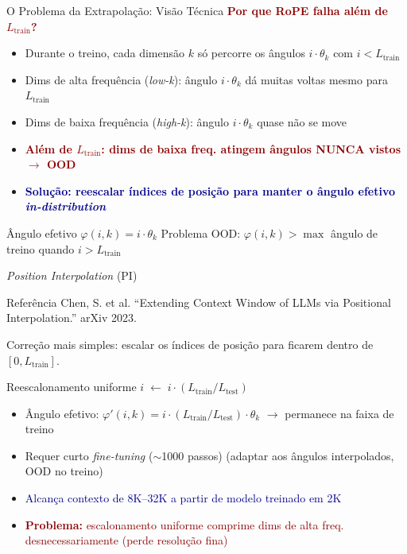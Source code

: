 \documentclass[aspectratio=169, xcolor=dvipsnames]{beamer}
\begin{document}
  \begin{frame}{O Problema da Extrapolação: Visão Técnica}
    \textcolor{DarkRed}{\textbf{Por que RoPE falha além de $L_{\text{train}}$?}}

    \begin{itemize}
      \item Durante o treino, cada dimensão $k$ só percorre os ângulos $i \cdot \theta_k$ com $i < L_{\text{train}}$
      \item Dims de alta frequência (\textit{low-k}): ângulo $i \cdot \theta_k$ dá muitas voltas mesmo para $L_{\text{train}}$
      \item Dims de baixa frequência (\textit{high-k}): ângulo $i \cdot \theta_k$ quase não se move
      \item \textcolor{DarkRed}{\textbf{Além de $L_{\text{train}}$: dims de baixa freq. atingem ângulos NUNCA vistos $\to$ OOD}}
      \item \textcolor{DarkBlue}{\textbf{Solução: reescalar índices de posição para manter o ângulo efetivo \textit{in-distribution}}}
    \end{itemize}

    \begin{exampleblock}{Ângulo efetivo}
      $\varphi(i, k) = i \cdot \theta_k$ \qquad Problema OOD: $\varphi(i, k) > \max$ ângulo de treino quando $i > L_{\text{train}}$
    \end{exampleblock}
  \end{frame}

  \begin{frame}{\textit{Position Interpolation} (PI)}
    \begin{exampleblock}{Referência}
      Chen, S. et al. ``Extending Context Window of LLMs via Positional Interpolation.'' arXiv 2023.
    \end{exampleblock}

    Correção mais simples: escalar os índices de posição para ficarem dentro de $[0, L_{\text{train}}]$.

    \begin{block}{Reescalonamento uniforme}
      $i \;\leftarrow\; i \cdot (L_{\text{train}} / L_{\text{test}})$
    \end{block}

    \begin{itemize}
      \item Ângulo efetivo: $\varphi'(i,k) = i \cdot (L_{\text{train}}/L_{\text{test}}) \cdot \theta_k$ $\to$ permanece na faixa de treino
      \item Requer curto \textit{fine-tuning} ($\sim$1000 passos) \textcolor{MidGray}{\scriptsize (adaptar aos ângulos interpolados, OOD no treino)}
      \item \textcolor{DarkBlue}{Alcança contexto de 8K--32K a partir de modelo treinado em 2K}
      \item \textcolor{DarkRed}{\textbf{Problema:} escalonamento uniforme comprime dims de alta freq. desnecessariamente (perde resolução fina)}
    \end{itemize}
  \end{frame}
\end{document}
